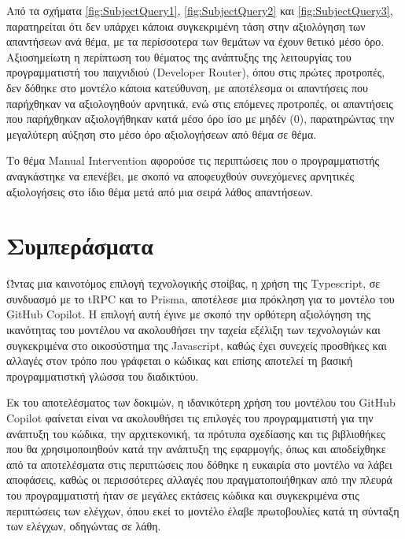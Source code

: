 Από τα σχήματα \ref{fig:SubjectQuery1}, \ref{fig:SubjectQuery2} και
\ref{fig:SubjectQuery3}, παρατηρείται ότι δεν υπάρχει κάποια
συγκεκριμένη τάση στην αξιολόγηση των απαντήσεων ανά θέμα, με τα
περίσσοτερα των θεμάτων να έχουν θετικό μέσο όρο. Αξιοσημείωτη η
περίπτωση του θέματος της ανάπτυξης της λειτουργίας του προγραμματιστή
του παιχνιδιού (\textlatin{Developer Router}), όπου στις πρώτες
προτροπές, δεν δόθηκε στο μοντέλο κάποια κατεύθυνση, με αποτέλεσμα οι
απαντήσεις που παρήχθηκαν να αξιολογηθούν αρνητικά, ενώ στις επόμενες
προτροπές, οι απαντήσεις που παρήχθηκαν αξιολογήθηκαν κατά μέσο όρο ίσο
με μηδέν (0), παρατηρώντας την μεγαλύτερη αύξηση στο μέσο όρο
αξιολογήσεων από θέμα σε θέμα.

Το θέμα \textlatin{Manual Intervention} αφορούσε τις περιπτώσεις που ο
προγραμματιστής αναγκάστηκε να επενέβει, με σκοπό να αποφευχθούν
συνεχόμενες αρνητικές αξιολογήσεις στο ίδιο θέμα μετά από μια σειρά
λάθος απαντήσεων.

\section{Συμπεράσματα}

Ώντας μια καινοτόμος επιλογή τεχνολογικής στοίβας, η χρήση της
\textlatin{Typescript}, σε συνδυασμό με το \textlatin{tRPC} και το
\textlatin{Prisma}, αποτέλεσε μια πρόκληση για το μοντέλο του
\textlatin{GitHub Copilot}. Η επιλογή αυτή έγινε με σκοπό την ορθότερη
αξιολόγηση της ικανότητας του μοντέλου να ακολουθήσει την ταχεία εξέλιξη
των τεχνολογιών και συγκεκριμένα στο οικοσύστημα της
\textlatin{Javascript}, καθώς έχει συνεχείς προσθήκες και αλλαγές στον
τρόπο που γράφεται ο κώδικας και επίσης αποτελεί τη βασική
προγραμματιστκή γλώσσα του διαδικτύου.

Εκ του αποτελέσματος των δοκιμών, η ιδανικότερη χρήση του μοντέλου του
\textlatin{GitHub Copilot} φαίνεται είναι να ακολουθήσει τις επιλογές
του προγραμματιστή για την ανάπτυξη του κώδικα, την αρχιτεκονική, τα
πρότυπα σχεδίασης και τις βιβλιοθήκες που θα χρησιμοποιηθούν κατά την
ανάπτυξη της εφαρμογής, όπως και αποδείχθηκε από τα αποτελέσματα στις
περιπτώσεις που δόθηκε η ευκαιρία στο μοντέλο να λάβει αποφάσεις, καθώς
οι περισσότερες αλλαγές που πραγματοποιήθηκαν από την πλευρά του
προγραμματιστή ήταν σε μεγάλες εκτάσεις κώδικα και συγκεκριμένα στις
περιπτώσεις των ελέγχων, όπου εκεί το μοντέλο έλαβε πρωτοβουλίες κατά τη
σύνταξη των ελέγχων, οδηγώντας σε λάθη.

